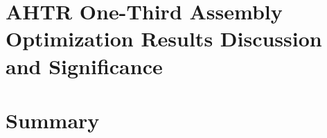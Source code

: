 \section{AHTR One-Third Assembly Optimization Results Discussion and Significance}
\label{sec:assem-discussion}

\section{Summary}